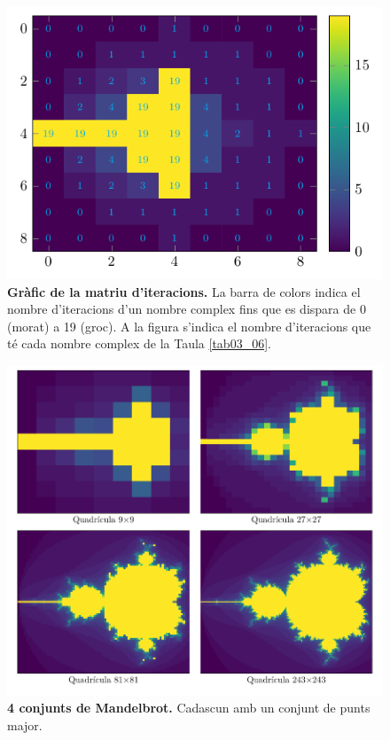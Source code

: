 \documentclass[12pt,a4paper]{report}
\begin{document}
\begin{figure}[!ht]
\centering
\includegraphics[scale=1.4]{img/matrix_mandelbrot.pdf}
\caption{\textbf{Gràfic de la matriu d'iteracions.} La barra de colors indica el nombre d'iteracions d'un nombre complex fins que es dispara de 0 (morat) a 19 (groc). A la figura s'indica el nombre d'iteracions que té cada nombre complex de la Taula \ref{tab03_06}.}
\end{figure}

\begin{figure}[!ht]
\centering
\includegraphics[scale=1]{img/several_mandelbrot.pdf}
\caption{\textbf{4 conjunts de Mandelbrot.}  Cadascun amb un conjunt de punts major.}
\end{figure}
\end{document}
